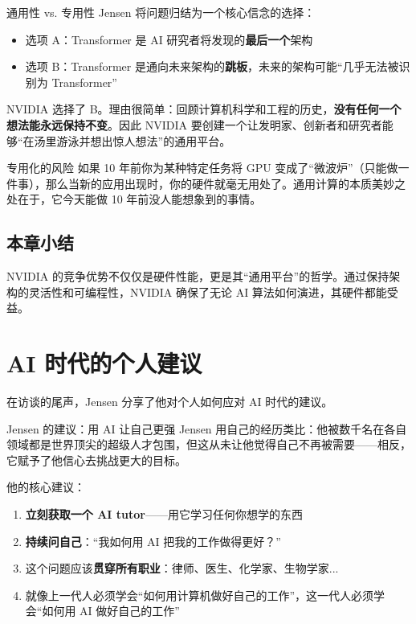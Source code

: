 \documentclass[a4paper]{article}
\begin{document}
\begin{importantbox}{通用性 vs. 专用性}
Jensen 将问题归结为一个核心信念的选择：
\begin{itemize}
    \item 选项 A：Transformer 是 AI 研究者将发现的\textbf{最后一个}架构
    \item 选项 B：Transformer 是通向未来架构的\textbf{跳板}，未来的架构可能``几乎无法被识别为 Transformer''
\end{itemize}
NVIDIA 选择了 B。理由很简单：回顾计算机科学和工程的历史，\textbf{没有任何一个想法能永远保持不变}。因此 NVIDIA 要创建一个让发明家、创新者和研究者能够``在汤里游泳并想出惊人想法''的通用平台。
\end{importantbox}

\begin{warningbox}{专用化的风险}
如果 10 年前你为某种特定任务将 GPU 变成了``微波炉''（只能做一件事），那么当新的应用出现时，你的硬件就毫无用处了。通用计算的本质美妙之处在于，它今天能做 10 年前没人能想象到的事情。
\end{warningbox}

\subsection{本章小结}
NVIDIA 的竞争优势不仅仅是硬件性能，更是其``通用平台''的哲学。通过保持架构的灵活性和可编程性，NVIDIA 确保了无论 AI 算法如何演进，其硬件都能受益。

\section{AI 时代的个人建议}

在访谈的尾声，Jensen 分享了他对个人如何应对 AI 时代的建议。

\begin{importantbox}{Jensen 的建议：用 AI 让自己更强}
Jensen 用自己的经历类比：他被数千名在各自领域都是世界顶尖的超级人才包围，但这从未让他觉得自己不再被需要——相反，它赋予了他信心去挑战更大的目标。

他的核心建议：
\begin{enumerate}
    \item \textbf{立刻获取一个 AI tutor}——用它学习任何你想学的东西
    \item \textbf{持续问自己}：``我如何用 AI 把我的工作做得更好？''
    \item 这个问题应该\textbf{贯穿所有职业}：律师、医生、化学家、生物学家...
    \item 就像上一代人必须学会``如何用计算机做好自己的工作''，这一代人必须学会``如何用 AI 做好自己的工作''
\end{enumerate}
\end{importantbox}
\end{document}
